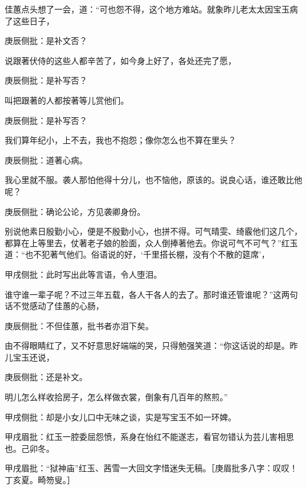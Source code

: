 \begin{parag}


    佳蕙点头想了一会，道：“可也怨不得，这个地方难站。就象昨儿老太太因宝玉病了这些日子，\begin{note}庚辰侧批：是补文否？\end{note}说跟著伏侍的这些人都辛苦了，如今身上好了，各处还完了愿，\begin{note}庚辰侧批：是补写否？\end{note}叫把跟著的人都按著等儿赏他们。\begin{note}庚辰侧批：是补写否？\end{note}我们算年纪小，上不去，我也不抱怨；像你怎么也不算在里头？\begin{note}庚辰侧批：道著心病。\end{note}我心里就不服。袭人那怕他得十分儿，也不恼他，原该的。说良心话，谁还敢比他呢？\begin{note}庚辰侧批：确论公论，方见袭卿身份。\end{note}别说他素日殷勤小心，便是不殷勤小心，也拼不得。可气晴雯、绮霰他们这几个，都算在上等里去，仗著老子娘的脸面，众人倒捧著他去。你说可气不可气？”红玉道：“也不犯著气他们。俗语说的好，‘千里搭长棚，没有个不散的筵席’，\begin{note}甲戌侧批：此时写出此等言语，令人堕泪。\end{note}谁守谁一辈子呢？不过三年五载，各人干各人的去了。那时谁还管谁呢？”这两句话不觉感动了佳蕙的心肠，\begin{note}庚辰侧批：不但佳蕙，批书者亦泪下矣。\end{note}由不得眼睛红了，又不好意思好端端的哭，只得勉强笑道：“你这话说的却是。昨儿宝玉还说，\begin{note}庚辰侧批：还是补文。\end{note}明儿怎么样收拾房子，怎么样做衣裳，倒象有几百年的熬煎。”\begin{note}甲戌侧批：却是小女儿口中无味之谈，实是写宝玉不如一环婢。\end{note}\begin{note}甲戌眉批：红玉一腔委屈怨愤，系身在怡红不能遂志，看官勿错认为芸儿害相思也。己卯冬。\end{note}\begin{note}甲戌眉批：“狱神庙”红玉、茜雪一大回文字惜迷失无稿。［庚眉批多八字：叹叹！丁亥夏。畸笏叟。］\end{note}
\end{parag}


